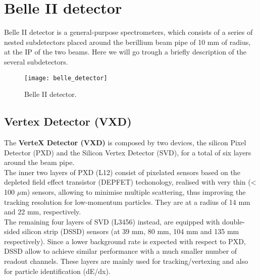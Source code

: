 \begin{comment}
\begin{itemize}
\item allows the placement of a new focusing system in the IP with a superconducting quadrupole magnet;
\item allows to have two distinct line which host HER and LER beams;
\item diminishes the \textit{fringe fields} effect in the IP, wihch are the residuals of the magnets (magnetic fields) in the nearby. 
\end{itemize}


In figure \vref{fig:beampar} are reported the main machine parameters (default value) of the SuperKEKB accelerator.

\begin{figure}[h!]
\centering
\texttt{[image: beam\_par]}
\caption{Machine parameters of SuperKEKB. The mark ''*'' indicate values in the IP.}
\label{fig:beampar}
\end{figure}
\end{comment}


\section{Belle II detector}


Belle II detector is a general-purpose spectrometers, which consists of a series of nested subdetectors placed around the berillium beam pipe of 10 mm of radius, at the IP of the two beams. Here we will go trough a briefly description of the several subdetectors. 

\begin{figure}[h!]
\centering
\texttt{[image: belle\_detector]}
\caption{Belle II detector.}
\label{fig:belle_detector}
\end{figure}


\subsection{Vertex Detector (VXD)}


The \textbf{VerteX Detector (VXD)} is composed by two devices, the silicon Pixel Detector (PXD) and the Silicon Vertex Detector (SVD), for a total of six layers around the beam pipe.\\
The inner two layers of PXD (L12) consist of pixelated sensors based on the depleted field effect transistor (DEPFET) techonology, realised with very thin (< 100 $\mu$m) sensors, allowing to minimise multiple scattering, thus improving the tracking resolution for low-momentum particles. They are at a radius of 14 mm and 22 mm, respectively. \\
The remaining four layers of SVD (L3456) instead, are equipped with double-sided silicon strip (DSSD) sensors (at 39 mm, 80 mm, 104 mm and 135 mm respectively). Since a lower background rate is expected with respect to PXD, DSSD allow to achieve similar performance with a much smaller number of readout channels.
These layers are mainly used for tracking/vertexing and also for particle identification (dE/dx). 

